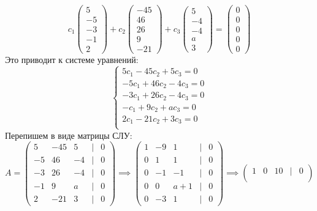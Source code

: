 \documentclass[a4paper]{article}
\newcommand{\mat}[1]{\begin{pmatrix} #1 \end{pmatrix}}
\newcommand{\case}[1]{\begin{cases} #1 \end{cases}}
\begin{document}
\begin{enumerate}
    $$
    c_1 \begin{pmatrix}
    5 \\
    -5 \\
    -3 \\
    -1 \\
    2
    \end{pmatrix} + c_2 \begin{pmatrix}
    -45 \\
    46 \\
    26 \\
    9 \\
    -21
    \end{pmatrix} + c_3 \begin{pmatrix}
    5 \\
    -4 \\
    -4 \\
    a \\
    3
    \end{pmatrix} = \begin{pmatrix}
    0 \\
    0 \\
    0 \\
    0 \\
    0
    \end{pmatrix}
    $$
Это приводит к системе уравнений:
    $$
    \case{
    5c_1 - 45c_2 + 5c_3 = 0 \\
    -5c_1 + 46c_2 - 4c_3 = 0 \\
    -3c_1 + 26c_2 - 4c_3 = 0 \\
    -c_1 + 9c_2 + ac_3 = 0 \\
    2c_1 - 21c_2 + 3c_3 = 0 \\
    }
    $$
    Перепишем в виде матрицы СЛУ:
    $$
    A = \mat{5 & -45 & 5 &|& 0\\ -5 & 46 & -4 &|&0\\ -3 & 26 & -4&|& 0\\ -1 & 9 & a&|& 0\\ 2 & -21 & 3&|&0}
    \implies \begin{pmatrix}
        1 & -9 & 1 & | & 0 \\
        0 & 1 & 1 & | & 0 \\
        0 & -1 & -1 & | & 0 \\
        0 & 0 & a + 1 & | & 0 \\
        0 & -3 & 1 & | & 0
        \end{pmatrix}
    \implies \begin{pmatrix}
        1 & 0 & 10 & | & 0 \\

\end{pmatrix}$$
\end{enumerate}
\end{document}
